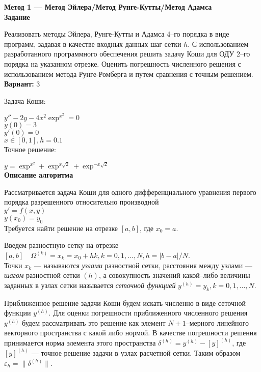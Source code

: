 \textbf{Метод 1 --- Метод Эйлера/Метод Рунге-Кутты/Метод Адамса}\\

\textbf{Задание}

Реализовать методы Эйлера, Рунге-Кутты и Адамса 4--го порядка в виде программ, задавая в качестве входных данных шаг сетки $h$. С использованием разработанного программного обеспечения решить задачу Коши для ОДУ 2--го порядка на указанном отрезке. Оценить погрешность численного решения с использованием метода Рунге-Ромберга и путем сравнения с точным решением.\\

\textbf{Вариант:} 3

Задача Коши:

$y''-2y-4x^2\exp^{x^2}=0$\\
$y(0)=3$\\
$y'(0)=0$\\
$x \in [0, 1], h=0.1$\\

Точное решение:

$y=\exp^{x^2}+\exp^{x\sqrt{2}}+\exp^{-x\sqrt{2}}$\\

\textbf{Описание алгоритма}

Рассматривается задача Коши для одного дифференциального уравнения первого порядка разрешенного относительно производной\\

$y'=f(x, y)$\\
$y(x_0)=y_0$\\

Требуется найти решение на отрезке $[a, b]$, где $x_0=a$.

Введем разностную сетку на отрезке $[a, b] \quad \Omega^{(k)}={x_k=x_0+hk}, k=0,1,...,N, h=|b-a|/N$.\\

Точки $x_k$ --- называются \textit{узлами} разностной сетки, расстояния между узлами --- \textit{шагом} разностной сетки $(h)$, а совокупность значений какой--либо величины заданных в узлах сетки называется \textit{сеточной функцией} $y^{(h)}={y_k, k=0,1,...,N}$.

Приближенное решение задачи Коши будем искать численно в виде сеточной функции $y^{(h)}$. Для оценки погрешности приближенного численного решения $y^{(h)}$ будем рассматривать это решение как элемент $N+1$--мерного линейного векторного пространства с какой либо нормой. В качестве погрешности решения принимается норма элемента этого пространства $\delta^{(h)}=y^{(h)}-[y]^{(h)}$, где $[y]^{(h)}$ --- точное решение задачи в узлах расчетной сетки. Таким образом $\varepsilon_h=\|\delta^{(h)}\|$.\\

